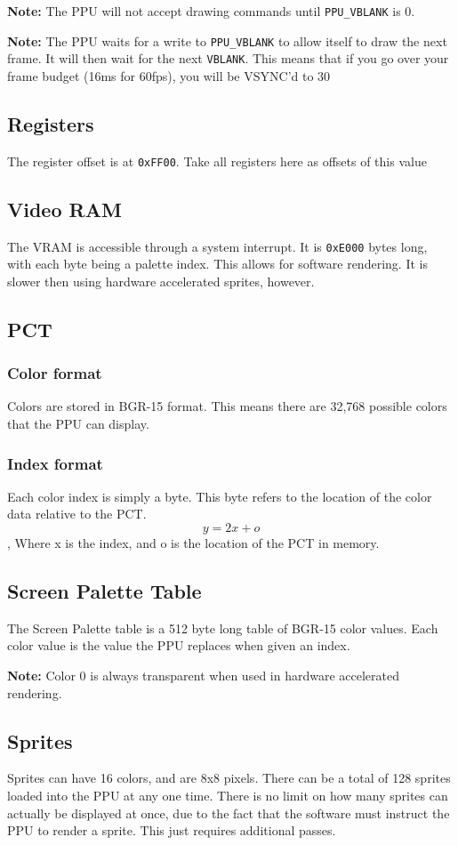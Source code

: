\documentclass[10pt,a4paper]{article}
\def\tcode#1{\texttt{#1}}
\newcommand{\tbold}[1]{\textbf{#1}}
\begin{document}
			\tbold{Note:} The PPU will not accept drawing commands until \tcode{PPU\_VBLANK} is 0.
			
			\tbold{Note:} The PPU waits for a write to \tcode{PPU\_VBLANK} to allow itself to draw the next frame. It will then wait for the next \tcode{VBLANK}. This means that if you go over your frame budget (16ms for 60fps), you will be VSYNC'd to 30
		\subsection{Registers}
			The register offset is at \tcode{0xFF00}. Take all registers here as offsets of this value
		\subsection{Video RAM}
			The VRAM is accessible through a system interrupt. It is \tcode{0xE000} bytes long, with each byte being a palette index. This allows for software rendering. It is slower then using hardware accelerated sprites, however.
			
		\subsection{PCT}
			\subsubsection{Color format}
				Colors are stored in BGR-15 format. This means there are 32,768 possible colors that the PPU can display.
			\subsubsection{Index format}
				Each color index is simply a byte. This byte refers to the location of the color data relative to the PCT.
				\[ y = 2x + o\], Where x is the index, and o is the location of the PCT in memory.
		\subsection{Screen Palette Table}
			The Screen Palette table is a 512 byte long table of BGR-15 color values. Each color value is the value the PPU replaces when given an index.
			
			\tbold{Note:} Color 0 is always transparent when used in hardware accelerated rendering.
		\subsection{Sprites}
			Sprites can have 16 colors, and are 8x8 pixels.
			There can be a total of 128 sprites loaded into the PPU at any one time. There is no limit on how many sprites can actually be displayed at once, due to the fact that the software must instruct the PPU to render a sprite. This just requires additional passes.
			
\end{document}
